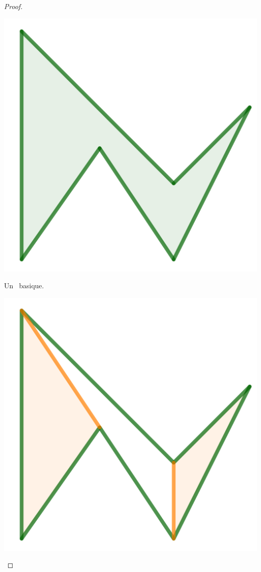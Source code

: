\begin{proof}
    \begin{multicols}{2}
        \small\itshape
        \begin{center}
            \includegraphics[scale=.4]{mini-ear-1.png}

            \smallskip
               Un \ngone\ basique.
        \end{center}

        \begin{center}
            \includegraphics[scale=.4]{mini-ear-2.png}


\end{center}
\end{multicols}
\end{proof}
